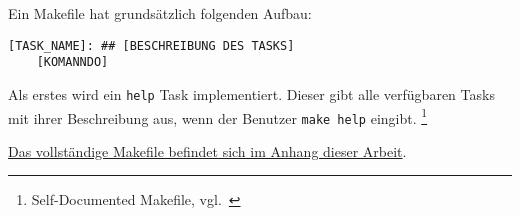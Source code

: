 Ein Makefile hat grundsätzlich folgenden Aufbau:

\lstset{language=bash}
\begin{lstlisting}[frame=htrbl, caption={Makefile Aufbau}, label={lst:makefile_aufbau}]
[TASK_NAME]: ## [BESCHREIBUNG DES TASKS]
    [KOMANNDO]
\end{lstlisting}

Als erstes wird ein \texttt{help} Task implementiert.
Dieser gibt alle verfügbaren Tasks mit ihrer Beschreibung aus, wenn der Benutzer \texttt{make help} eingibt.
\footnote{{Self-Documented Makefile, vgl.~\cite{MAKEFILE_HELP}}}

\hyperref[lst:makefile]{Das vollständige Makefile befindet sich im Anhang dieser Arbeit}.

%
%
%
%
%
%
